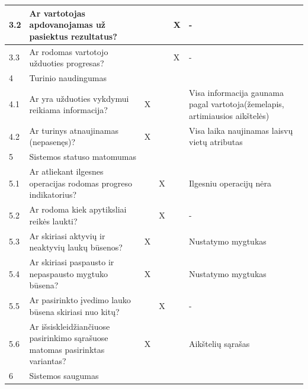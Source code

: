 \documentclass{VUMIFPSkursinis}
\begin{document}
\begin{longtable}[c]{|p{1cm}|p{4cm}|p{1cm}|p{1cm}|p{1.6cm}|p{4cm}|}
3.2   & Ar vartotojas apdovanojamas už pasiektus rezultatus?                                                 &     &     &     X     &   -         \\ \hline
3.3   & Ar rodomas vartotojo užduoties progresas?                                                            &     &     &     X     &   -         \\ \hline
4     & \multicolumn{5}{l|}{Turinio naudingumas}                                                                                                   \\ \hline
4.1   & Ar yra užduoties vykdymui reikiama informacija?                                                      &  X  &     &           &   Visa informacija gaunama pagal vartotoja(žemelapis, artimiausios aikštelės)  \\ \hline
4.2   & Ar turinys atnaujinamas (nepasenęs)?                                                                 &  X  &     &           &   Visa laika naujinamas laisvų vietų atributas   \\ \hline
5     & \multicolumn{5}{l|}{Sistemos statuso matomumas}                                                                                            \\ \hline
5.1   & Ar atliekant ilgesnes operacijas rodomas progreso indikatorius?                                      &     &  X  &           &   Ilgesniu operacijų nėra  \\ \hline
5.2   & Ar rodoma kiek apytiksliai reikės laukti?                                                            &     &  X  &           &   -          \\ \hline
5.3   & Ar skiriasi aktyvių ir neaktyvių laukų būsenos?                                                      &  X  &     &           &   Nustatymo mygtukas          \\ \hline
5.4   & Ar skiriasi paspausto ir nepaspausto mygtuko būsena?                                                 &  X  &     &           &   Nustatymo mygtukas          \\ \hline
5.5   & Ar pasirinkto įvedimo lauko būsena skiriasi nuo kitų?                                                &     &  X  &           &   -          \\ \hline
5.6   & Ar išsiskleidžiančiuose pasirinkimo sąrašuose matomas pasirinktas variantas?                         &  X  &     &           &   Aikštelių sąrašas          \\ \hline
6     & \multicolumn{5}{l|}{Sistemos saugumas}                                                                                                     \\ \hline

\end{longtable}
\end{document}
